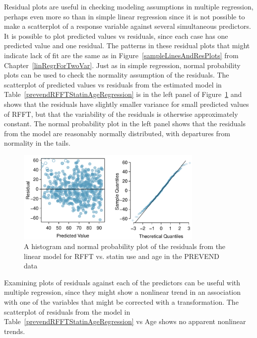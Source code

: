 Residual plots are useful in checking modeling assumptions in multiple regression, perhaps even more so than in simple linear regression since it is not possible to make a scatterplot of a response variable against several simultaneous predictors.  It is possible to plot predicted values vs residuals, since each case has one predicted value and one residual. The patterns in these residual plots that might indicate lack of fit are the same as in Figure~\ref{sampleLinesAndResPlots} from Chapter~\ref{linRegrForTwoVar}. Just as in simple regression, normal probability plots can be used to check the normality assumption of the residuals.  The scatterplot of predicted values vs residuals from the estimated model in Table~\ref{prevendRFFTStatinAgeRegression} is in the left panel of Figure~\ref{prevendStatinAgeResidNormPlot} and shows that the residuals have slightly smaller variance for small predicted values of RFFT, but that the variability of the residuals is otherwise approximately constant.  The normal probability plot in the left panel shows that the residuals from the model are reasonably normally distributed, with departures from normality in the tails.


\begin{figure}[h!]
	\centering
	\includegraphics[width=0.8\textwidth]
	{ch_multiple_linear_regression_oi_biostat/figures/prevendStatinAgeResidNormPlot/prevendStatinAgeResidNormPlot.pdf}
	\caption{A histogram and normal probability plot of the residuals from the linear model for RFFT vs. statin use and age in the PREVEND data}
	\label{prevendStatinAgeResidNormPlot}
\end{figure}


Examining plots of residuals against each of the predictors can be useful with multiple regression, since they might show a nonlinear trend in an association with one of the variables that might be corrected with a transformation.  The scatterplot of residuals from the model in Table~\ref{prevendRFFTStatinAgeRegression} vs Age shows no apparent nonlinear trends.  


